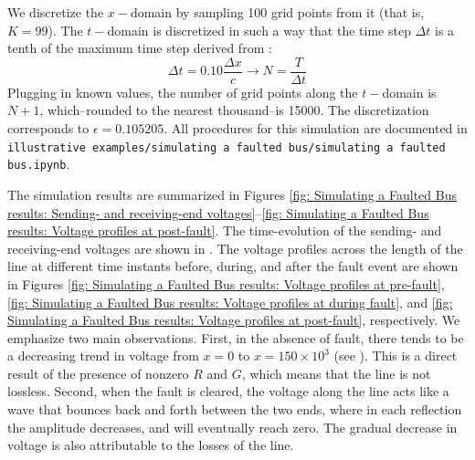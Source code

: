 \documentclass{article}
\begin{document}
We discretize the $x-$domain by sampling 100 grid points from it (that is, $K = 99$).
The $t-$domain is discretized in such a way that the time step $\Delta t$ is a tenth of the maximum time step derived from :
\begin{equation*}
	\Delta t = 0.10 \frac{\Delta x}{c} \longrightarrow N = \frac{T}{\Delta t}
\end{equation*}
Plugging in known values, the number of grid points along the $t-$domain is $N + 1$, which--rounded to the nearest thousand--is 15000.
The discretization corresponds to $\epsilon = 0.105205$.
All procedures for this simulation are documented in
{\tt illustrative examples/simulating a faulted bus/simulating a faulted bus.ipynb}.

The simulation results are summarized in Figures
\ref{fig: Simulating a Faulted Bus results: Sending- and receiving-end voltages}--\ref{fig: Simulating a Faulted Bus results: Voltage profiles at post-fault}.
The time-evolution of the sending- and receiving-end voltages are shown in .
The voltage profiles across the length of the line at different time instants before, during, and after the fault event
are shown in Figures
\ref{fig: Simulating a Faulted Bus results: Voltage profiles at pre-fault},
\ref{fig: Simulating a Faulted Bus results: Voltage profiles at during fault}, and
\ref{fig: Simulating a Faulted Bus results: Voltage profiles at post-fault},
respectively.
We emphasize two main observations.
First, in the absence of fault, there tends to be a decreasing trend in voltage from $x=0$ to $x=150 \times 10^{3}$
(see ).
This is a direct result of the presence of nonzero $R$ and $G$, which means that the line is not lossless.
Second, when the fault is cleared, the voltage along the line acts like a wave that bounces back and forth between the two ends,
where in each reflection the amplitude decreases, and will eventually reach zero.
The gradual decrease in voltage is also attributable to the losses of the line.
\end{document}
